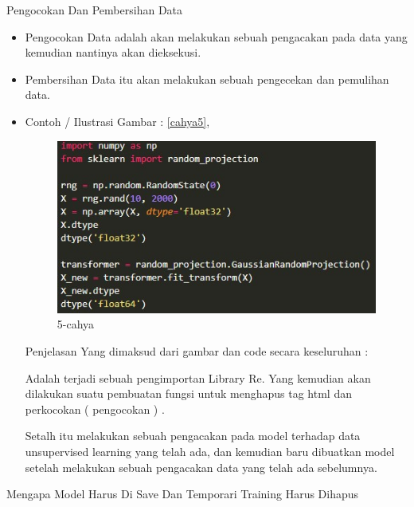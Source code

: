 \item Pengocokan Dan Pembersihan Data
\begin{itemize}
\item Pengocokan Data adalah akan melakukan sebuah pengacakan pada data yang kemudian nantinya akan dieksekusi. 
\item Pembersihan Data itu akan  melakukan sebuah pengecekan dan pemulihan data.
\item Contoh / Ilustrasi Gambar : \ref{cahya5}, 
\par
\begin{figure}[!hbtp]
\centering
\includegraphics[scale=0.3]{figures/cahya5.png}
\caption{5-cahya}
\label{5-cahya}
\end{figure}
\par
\par Penjelasan Yang dimaksud dari gambar dan code secara keseluruhan : 
\par Adalah terjadi sebuah pengimportan Library Re. Yang kemudian akan  dilakukan suatu pembuatan fungsi untuk menghapus tag html dan perkocokan ( pengocokan ) .
\par Setalh itu melakukan sebuah pengacakan pada model terhadap data unsupervised learning yang telah ada, dan kemudian baru dibuatkan model setelah melakukan sebuah pengacakan data yang telah ada sebelumnya.
\par
\end{itemize}
\item Mengapa Model Harus Di Save Dan Temporari Training Harus Dihapus
